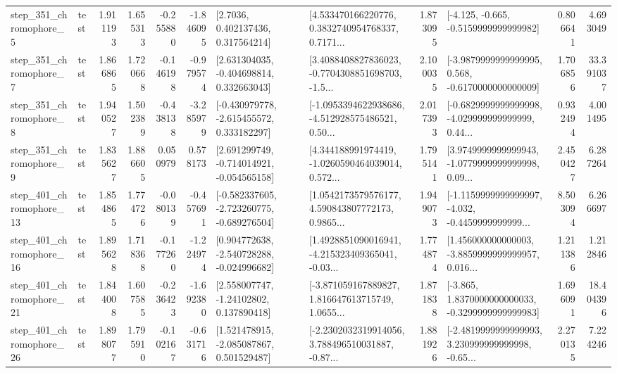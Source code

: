 \begin{tabular}{llrrrrllrlrr}
   step\_351\_chromophore\_5 &      test &      1.911193 &    1.655313 &     -0.255880 & -1.846095 &          [2.7036, 0.402137436, 0.317564214] &  [4.533470166220776, 0.3832740954768337, 0.7171... &       1.873095 &              [-4.125, -0.665, -0.5159999999999982] &            0.806641 &          4.693049 \\
   step\_351\_chromophore\_7 &      test &      1.866865 &    1.720668 &     -0.146198 & -0.979574 &    [2.631304035, -0.404698814, 0.332663043] &  [3.4088408827836023, -0.7704308851698703, -1.5... &       2.100035 &  [-3.9879999999999995, 0.568, -0.6170000000000009] &            1.706856 &         33.391037 \\
   step\_351\_chromophore\_8 &      test &      1.940527 &    1.502389 &     -0.438138 & -3.285979 &   [-0.430979778, -2.615455572, 0.333182297] &  [-1.0953394622938686, -4.512928575486521, 0.50... &       2.017393 &  [-0.6829999999999998, -4.029999999999999, 0.44... &            0.932494 &          4.001495 \\
   step\_351\_chromophore\_9 &      test &      1.835627 &    1.886605 &      0.050979 &  0.578173 &   [2.691299749, -0.714014921, -0.054565158] &  [4.344188991974419, -1.0260590464039014, 0.572... &       1.795141 &  [3.9749999999999943, -1.0779999999999998, 0.09... &            2.450427 &          6.287264 \\
  step\_401\_chromophore\_13 &      test &      1.854865 &    1.774726 &     -0.080139 & -0.457691 &  [-0.582337605, -2.723260775, -0.689276504] &  [1.0542173579576177, 4.590843807772173, 0.9865... &       1.949073 &  [-1.1159999999999997, -4.032, -0.4459999999999... &            8.503094 &          6.266697 \\
  step\_401\_chromophore\_16 &      test &      1.895628 &    1.718368 &     -0.177260 & -1.224974 &   [0.904772638, -2.540728288, -0.024996682] &  [1.4928851090016941, -4.215323409365041, -0.03... &       1.774874 &  [1.456000000000003, -3.8859999999999957, 0.016... &            1.211386 &          1.212846 \\
  step\_401\_chromophore\_21 &      test &      1.844008 &    1.607585 &     -0.236423 & -1.692380 &     [2.558007747, -1.24102802, 0.137890418] &  [-3.871059167889827, 1.816647613715749, 1.0655... &       1.871838 &  [-3.865, 1.8370000000000033, -0.3299999999999983] &            1.696091 &         18.404396 \\
  step\_401\_chromophore\_26 &      test &      1.898077 &    1.795910 &     -0.102167 & -0.631716 &    [1.521478915, -2.085087867, 0.501529487] &  [-2.2302032319914056, 3.788496510031887, -0.87... &       1.881926 &  [-2.4819999999999993, 3.230999999999998, -0.65... &            2.270135 &          7.224246 \\

\end{tabular}

